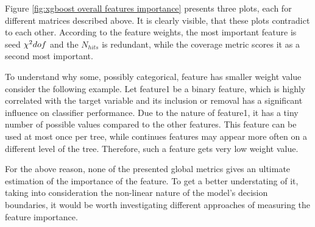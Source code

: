 Figure \ref{fig:xgboost overall features importance} presents three plots, each for different matrices described above. It is clearly visible, that these plots contradict to each other. According to the feature weights, the most important feature is seed $\chi^2\/dof$ and the $N_{hits}$ is redundant, while the coverage metric scores it as a second most important.

To understand why some, possibly categorical, feature has smaller weight value consider the following example. Let feature1 be a binary feature, which is highly correlated with the target variable and its inclusion or removal has a significant influence on classifier performance. Due to the nature of feature1, it has a tiny number of possible values compared to the other features. This feature can be used at most once per tree, while continues features may appear more often on a different level of the tree. Therefore, such a feature gets very low weight value. 

For the above reason, none of the presented global metrics gives an ultimate estimation of the importance of the feature. To get a better understating of it, taking into consideration the non-linear nature of the model's decision boundaries, it would be worth investigating different approaches of measuring the feature importance.  

